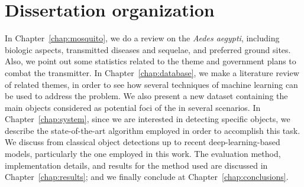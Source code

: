 \section{Dissertation organization}
%
In Chapter~\ref{chap:mosquito}, we do a review on the {\it Aedes aegypti}, including biologic aspects, transmitted diseases and sequelae, and preferred ground sites.
Also, we point out some statistics related to the theme and government plans to combat the transmitter.
In Chapter~\ref{chap:database}, we make a literature review of related themes, in order to see how several techniques of machine learning can be used to address the problem.
We also present a new dataset containing the main objects considered as potential foci of the \Aedes in several scenarios.
In Chapter~\ref{chap:system}, since we are interested in detecting specific objects, we describe the state-of-the-art algorithm employed in order to accomplish this task.
We discuss from classical object detections up to recent deep-learning-based models, particularly the one employed in this work.
The evaluation method, implementation details, and results for the method used are discussed in Chapter~\ref{chap:results}; and we finally conclude at Chapter~\ref{chap:conclusions}.


